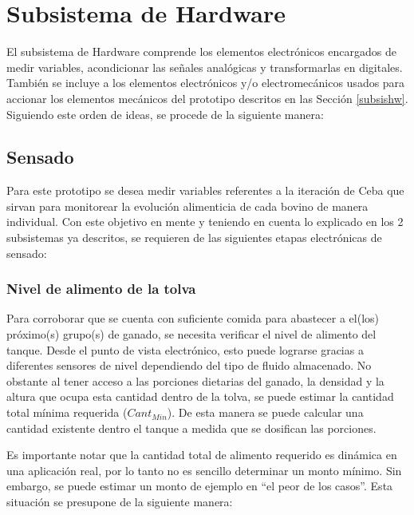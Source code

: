
\pagebreak
\section{Subsistema de Hardware} \label{subsissen} 

El subsistema de Hardware comprende los elementos electrónicos encargados de medir variables, acondicionar las señales analógicas y transformarlas en digitales. También se incluye a los elementos electrónicos y/o electromecánicos usados para accionar los elementos mecánicos del prototipo descritos en las Sección \ref{subsishw}. Siguiendo este orden de ideas, se procede de la siguiente manera:

\subsection{Sensado}

Para este prototipo se desea medir variables referentes a la iteración de Ceba que sirvan para monitorear la evolución alimenticia de cada bovino de manera individual. Con este objetivo en mente y teniendo en cuenta lo explicado en los 2 subsistemas ya descritos, se requieren de las siguientes etapas electrónicas de sensado:

\subsubsection{Nivel de alimento de la tolva}\label{lvltolva}
Para corroborar que se cuenta con suficiente comida para abastecer a el(los) próximo(s) grupo(s) de ganado, se necesita verificar el nivel de alimento del tanque. Desde el punto de vista electrónico, esto puede lograrse gracias a diferentes sensores de nivel dependiendo del tipo de fluido almacenado. No obstante al tener acceso a las porciones dietarias del ganado, la densidad y la altura que ocupa esta cantidad dentro de la tolva, se puede estimar la cantidad total mínima requerida ($Cant_{Min}$). De esta manera se puede calcular una cantidad existente dentro el tanque a medida que se dosifican las porciones.

Es importante notar que la cantidad total de alimento requerido es dinámica en una aplicación real, por lo tanto no es sencillo determinar un monto mínimo. Sin embargo, se puede estimar un monto de ejemplo en ``el peor de los casos''. Esta situación se presupone de la siguiente manera:

